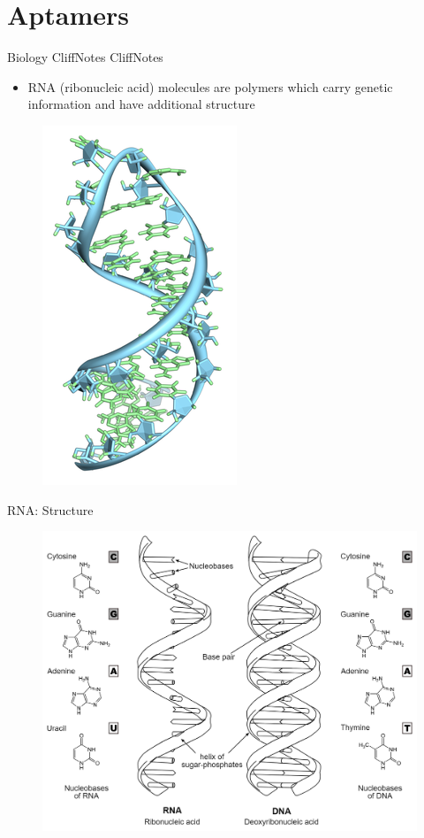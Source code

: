 \documentclass{beamer}
\begin{document}
\section{Aptamers}
\begin{frame}{Biology CliffNotes CliffNotes}
  \begin{itemize}
    \item RNA (ribonucleic acid) molecules are polymers which carry genetic information and have additional structure
  \end{itemize}
  \begin{figure}
    \begin{center}
      \includegraphics[width=.3\textwidth]{rna.png}\cite{rnahairpin}
    \end{center}
  \end{figure}
\end{frame}

\begin{frame}{RNA: Structure}
  \begin{figure}
    \begin{center}
      \includegraphics[width=.9\textwidth]{rnadna.png}\cite{rnadna}
    \end{center}
  \end{figure}
\end{frame}
\end{document}
